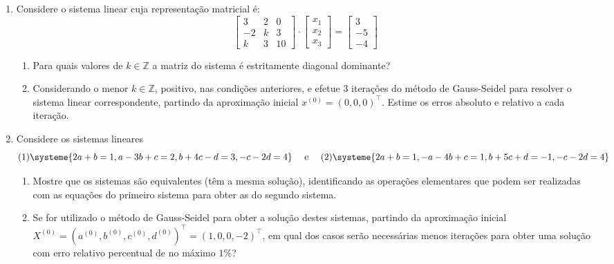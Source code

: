 \documentclass[12pt,a4paper]{article}
\begin{document}
\begin{enumerate}
\item Considere o sistema linear cuja representação matricial é:
\[
\begin{bmatrix}
 3 & 2 & 0 \\
-2 & k & 3 \\
 k & 3 & 10
\end{bmatrix}
\cdot
\begin{bmatrix}
x_1 \\ x_2 \\ x_3
\end{bmatrix}
=
\begin{bmatrix}
3 \\ -5 \\ -4
\end{bmatrix}
\]
\begin{enumerate}
\item Para quais valores de $k \in \mathbb{Z}$ a matriz do sistema é estritamente diagonal dominante?
\item Considerando o menor $k \in \mathbb{Z}$, positivo, nas condições anteriores, e efetue 3 iterações do método de Gauss-Seidel para resolver o sistema linear correspondente, partindo da aproximação inicial  $x^{(0)} = (0, 0, 0)^\intercal$. Estime os erros absoluto e relativo a cada iteração.
\end{enumerate}
\item Considere os sistemas lineares
\[(1)
\systeme{
2a+b    =1,
a-3b+c  =2,
  b+4c-d=3,
   -c-2d=4
}
\quad\text{ e }\quad
(2)
\systeme{
2a +b    =1,
-a-4b+c  =1,
  b+5c+d=-1,
   -c-2d=4
}
\]
\begin{enumerate}
\item Mostre que os sistemas são equivalentes (têm a mesma solução), identificando as operações elementares que podem ser realizadas com as equações do primeiro sistema para obter as do segundo sistema.
\item Se for utilizado o método de Gauss-Seidel para obter a solução destes sistemas, partindo da aproximação inicial $X^{(0)}=(a^{(0)}, b^{(0)}, c^{(0)},d^{(0)})^\intercal = (1, 0, 0, -2)^\intercal$, em qual dos casos serão necessárias menos iterações para obter uma solução com erro relativo percentual de no máximo $1\%$?
\end{enumerate}


\end{enumerate}
\end{document}
